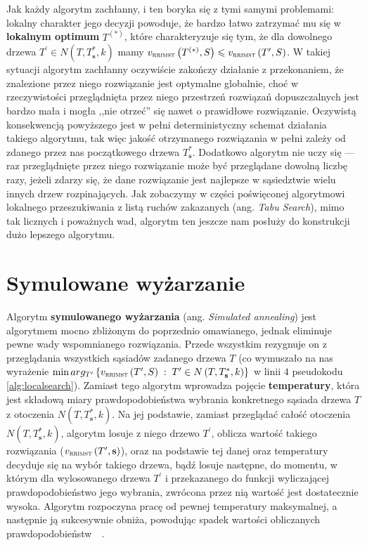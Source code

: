 Jak każdy algorytm zachłanny, i ten boryka się z tymi samymi problemami: lokalny charakter jego decyzji powoduje, że bardzo łatwo zatrzymać mu się w \textbf{lokalnym optimum} $T^{\left( \ast \right)}$, które charakteryzuje się tym, że dla dowolnego drzewa $T^{\prime} \in N \left( T, T^{\ast}_{\textbf{s}}, k \right)$ mamy $v_{\textsc{rrimst}} \left( T^{\left( \ast \right)}, S \right) \leqslant v_{\textsc{rrimst}} \left( T^{\prime}, S \right)$. W takiej sytuacji algorytm zachłanny oczywiście zakończy działanie z przekonaniem, że znalezione przez niego rozwiązanie jest optymalne globalnie, choć w rzeczywistości przeglądnięta przez niego przestrzeń rozwiązań dopuszczalnych jest bardzo mała i mogła ,,nie otrzeć'' się nawet o prawidłowe rozwiązanie. Oczywistą konsekwencją powyższego jest w pełni deterministyczny schemat działania takiego algorytmu, tak więc jakość otrzymanego rozwiązania w pełni zależy od zdanego przez nas początkowego drzewa $T^{\ast}_{\textbf{s}}$. Dodatkowo algorytm nie uczy się --- raz przeglądnięte przez niego rozwiązanie może być przeglądane dowolną liczbę razy, jeżeli zdarzy się, że dane rozwiązanie jest najlepsze w sąsiedztwie wielu innych drzew rozpinających. Jak zobaczymy w części poświęconej algorytmowi lokalnego przeszukiwania z listą ruchów zakazanych (ang. \textit{Tabu Search}), mimo tak licznych i poważnych wad, algorytm ten jeszcze nam posłuży do konstrukcji dużo lepszego algorytmu.

\section{Symulowane wyżarzanie}

Algorytm \textbf{symulowanego wyżarzania} (ang. \textit{Simulated annealing}) jest algorytmem mocno zbliżonym do poprzednio omawianego, jednak eliminuje pewne wady wspomnianego rozwiązania. Przede wszystkim rezygnuje on z przeglądania wszystkich sąsiadów zadanego drzewa $T$ (co wymuszało na nas wyrażenie $\min arg_{T^{\prime}} \left\{ v_{\textsc{rrimst}} \left( T^{\prime}, S \right) \; : \; T^{\prime} \in N \left( T, T^{\ast}_{\textbf{s}}, k \right) \right\}$ w linii $4$ pseudokodu \ref{alg:localsearch}). Zamiast tego algorytm wprowadza pojęcie \textbf{temperatury}, która jest składową miary prawdopodobieństwa wybrania konkretnego sąsiada drzewa $T$ z otoczenia $N \left( T, T^{\ast}_{\textbf{s}}, k \right)$. Na jej podstawie, zamiast przeglądać całość otoczenia $N \left( T, T^{\ast}_{\textbf{s}}, k \right)$, algorytm losuje z niego drzewo $T^{\prime}$, oblicza wartość takiego rozwiązania ($v_{\textsc{rrimst}} \left( T^{\prime}, \textbf{s} \right)$), oraz na podstawie tej danej oraz temperatury decyduje się na wybór takiego drzewa, bądź losuje następne, do momentu, w którym dla wylosowanego drzewa $T^{\prime}$ i przekazanego do funkcji wyliczającej prawdopodobieństwo jego wybrania, zwrócona przez nią wartość jest dostatecznie wysoka. Algorytm rozpoczyna pracę od pewnej temperatury maksymalnej, a następnie ją sukcesywnie obniża, powodując spadek wartości obliczanych prawdopodobieństw~\cite{Nikulin2008}~\cite{Jany2015}.

